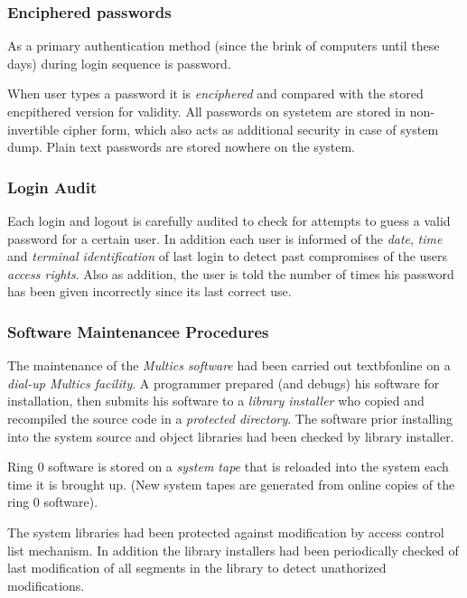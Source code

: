  \subsubsection{Enciphered passwords}

As a primary authentication method (since the brink of computers until these days) during login sequence 
is password.

When user types a password it is \textit{enciphered} and compared with the stored encpithered version for validity.
All passwords on systetem are stored in non-invertible cipher form, which also acts as additional security in case 
of system dump. Plain text passwords are stored nowhere on the system.

\subsubsection{Login Audit}

Each login and logout is carefully audited to check for attempts to guess a valid password for a certain user.
In addition each user is informed of the \textit{date}, \textit{time} and \textit{terminal identification} of last
login to detect past compromises of the users \textit{access rights}.
Also as addition, the user is told the number of times his password has been given incorrectly since its 
last correct use. 

\subsubsection{Software Maintenancee Procedures}

The maintenance of the \textit{Multics software} had been carried out textbf{online} on a \textit{dial-up 
Multics facility}. A programmer prepared (and debugs) his software for installation, then submits his
software to a \textit{library installer} who copied and recompiled the source code in a \textit{protected 
directory}. 
The software prior installing into the system source and object libraries had been checked by library installer.

Ring 0 software is stored on a \textit{system tape} that is reloaded into the system each time it is brought up.
(New system tapes are generated from online copies of the ring 0 software).

The system libraries had been protected against modification by access control list mechanism. In addition 
the library installers had been periodically checked of last modification of all segments in the library to
detect unathorized modifications.